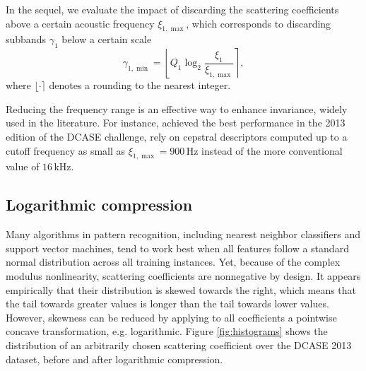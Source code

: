 \documentclass[journal]{IEEEtran}
\makeatletter
\newcommand*{\eg}{e.g.\@\xspace}
\makeatother
\begin{document}
In the sequel, we evaluate the impact of discarding the scattering coefficients above a certain acoustic frequency $\xi_{1,\max}$, which corresponds to discarding subbands $\gamma_1$ below a certain scale
\begin{equation}
\gamma_{1,\min} =
\left\lfloor Q_1 \log_2 \frac{\xi_1}{\xi_{1,\max}} \right\rceil,
\end{equation}
where $\lfloor \cdot \rceil$ denotes a rounding to the nearest integer.

Reducing the frequency range is an effective way to enhance invariance, widely used in the literature.
For instance, \cite{roma2013} achieved the best performance in the 2013 edition of the DCASE challenge, rely on cepstral descriptors computed up to a cutoff frequency as small as $\xi_{1,\max}  = 900\,\mathrm{Hz}$ instead of the more conventional value of $16\,\mathrm{kHz}$.
 
\subsection{Logarithmic compression}
\label{sec:logcomp}

Many algorithms in pattern recognition, including nearest neighbor classifiers and support vector machines, tend to work best when all features follow a standard normal distribution across all training instances.
Yet, because of the complex modulus nonlinearity, scattering coefficients are nonnegative by design.
It appears empirically that their distribution is skewed towards the right, which means that the tail towards greater values is longer than the tail towards lower values.
However, skewness can be reduced by applying to all coefficients a pointwise concave transformation, \eg logarithmic.
Figure \ref{fig:histograms} shows the distribution of an arbitrarily chosen scattering coefficient over the DCASE 2013 dataset, before and after logarithmic compression.
\end{document}
